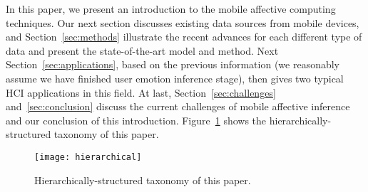 In this paper, we present an introduction to the mobile affective computing techniques. Our next section discusses existing data sources from mobile devices, and Section~\ref{sec:methods} illustrate the recent advances for each different type of data and present the state-of-the-art model and method. Next Section~\ref{sec:applications}, based on the previous information (we reasonably assume we have finished user emotion inference stage), then gives two typical HCI applications in this field. At last, Section~\ref{sec:challenges} and~\ref{sec:conclusion} discuss the current challenges of mobile affective inference and our conclusion of this introduction.
Figure~\ref{fig:hierarchically} shows the hierarchically-structured taxonomy of this paper.

\begin{figure}[htb]
    \centering
    \texttt{[image: hierarchical]}
    \caption{Hierarchically-structured taxonomy of this paper.}
    \label{fig:hierarchically}
\end{figure}
